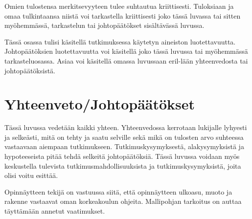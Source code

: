 \documentclass[finnish, 12pt, a4paper, elec, utf8, a-2b, online]{aaltothesis}
\begin{document}
Omien tulostensa merkitsevyyteen tulee suhtautua kriittisesti. Tuloksiaan ja 
omaa tulkintaansa niistä voi tarkastella kriittisesti joko tässä luvassa tai 
sitten myöhemmässä, tarkastelun tai johtopäätökset sisältävässä luvussa. 

Tässä osassa tulisi käsitellä tutkimuksessa käytetyn aineiston luotettavuutta. 
Johtopäätöksien luotettavuutta voi käsitellä joko tässä luvussa tai myöhemmässä 
tarkasteluosassa. Asiaa voi käsitellä omassa luvussaan eril-lään yhteenvedosta 
tai johtopäätöksistä.


\clearpage
\section{Yhteenveto/Johtopäätökset}
\label{luk:yhteenveto}

Tässä luvussa vedetään kaikki yhteen. Yhteenvedossa kerrotaan lukijalle 
lyhyesti ja selkeästi, mitä on tehty ja saatu selville sekä mikä on tulosten 
arvo suhteessa vastaavaan aiempaan tutkimukseen. Tutkimuskysymyksestä, 
alakysymyksistä ja hypoteeseista pitää tehdä selkeitä johtopäätöksiä. Tässä 
luvussa voidaan myös keskustella tulevista tutkimusmahdollisuuksista ja 
tutkimuskysymyksistä, joita olisi voitu esittää.

Opinnäytteen tekijä on vastuussa siitä, että opinnäytteen ulkoasu, muoto ja 
rakenne vastaavat oman korkeakoulun ohjeita. Mallipohjan tarkoitus on auttaa 
täyttämään annetut vaatimukset.



\clearpage
\thesisbibliography
\end{document}
